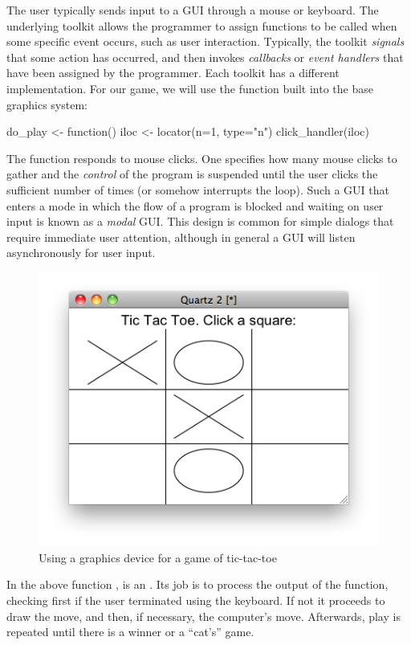 The user typically sends input to a GUI through a mouse or keyboard. 
The underlying toolkit allows the programmer to assign
functions to be called when some specific event occurs, such as user interaction. Typically, the
toolkit \textit{signals} that some action has occurred, and then
invokes \textit{callbacks} or \textit{event handlers} that have been
assigned by the programmer. Each toolkit has a different implementation. 
For our game, we will use the  function built
into the base \R\/ graphics system:
\begin{Schunk}
\begin{Sinput}
 do_play <- function() {
   iloc <- locator(n=1, type="n")
   click_handler(iloc)
 }
\end{Sinput}
\end{Schunk}
%
The  function responds to mouse clicks. One specifies
how many mouse clicks to gather and the \textit{control} of the
program is suspended until the user clicks the sufficient number of
times (or somehow interrupts the loop). Such a GUI that enters a mode
in which the flow of a program is blocked and waiting on user input is
known as a \textit{modal} GUI. This design is
common for simple dialogs that require immediate user attention,
although in general a GUI will listen asynchronously for user input.

\begin{figure}
  \centering
  \includegraphics[width=.6\textwidth]{fig-basics-tic-tac-toe}
  \caption{Using a graphics device for a game of tic-tac-toe}
  \label{fig:basics-tic-tac-toe}
\end{figure}



In the above function ,  is
an . Its job is to process the output of the
 function, checking first if the user terminated
 using the keyboard. If not it proceeds to draw the
move, and then, if necessary, the computer's move. Afterwards, play is
repeated until there is a winner or a ``cat's'' game.


